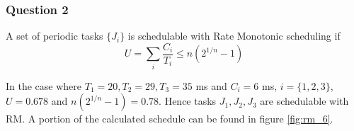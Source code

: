 \subsubsection{Question 2}

A set of periodic tasks $\{J_i\}$ is schedulable with Rate Monotonic scheduling
if $$U = \sum_{i} \dfrac{C_i}{T_i} \leq n(2^{1/n} - 1)$$

In the case where $T_1 = 20, T_2 = 29, T_3 = 35$ ms and $C_i = 6$ ms,
$i=\{1,2,3\}$, $U=0.678$ and $n(2^{1/n} - 1) = 0.78$. Hence tasks $J_1, J_2, J_3$
are schedulable with RM. A portion of the calculated schedule can be found in
figure \ref{fig:rm_6}.
